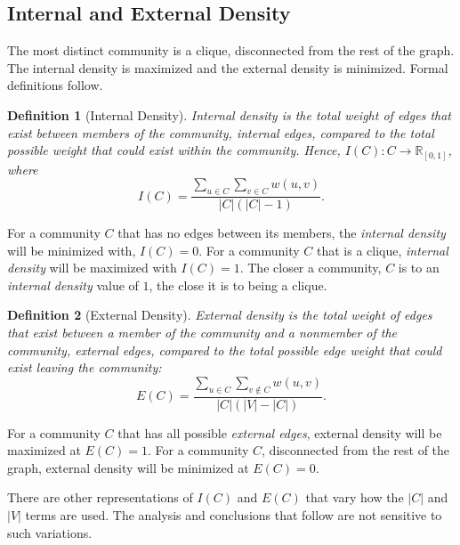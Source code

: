\documentclass[phd,tocprelim]{cornell}
\newtheorem{definition}{Definition}
\begin{document}
\subsection{Internal and External Density}

The most distinct community is a clique, disconnected from the rest of the graph.  The internal density is maximized and the external density is minimized.  Formal definitions follow.

\begin{definition}[Internal Density]
\label{def:int_density_single}
Internal density is the total weight of edges that exist between members of the community, {\it internal edges}, compared to the total possible weight that could exist within the community.  Hence, $I(C) : C \rightarrow \mathbb{R}_{[0, 1]}$, where
\begin{equation}
 I(C) =\frac{\sum_{u \in C} \sum_{v \in C} w(u,v)}{|C|(|C| - 1)} .
\end{equation}
\label{def_int_density}
\end{definition}

For a community $C$ that has no edges between its members, the {\it internal density} will be minimized with, $I(C) = 0$.  For a community $C$ that is a clique, {\it internal density} will be maximized with $I(C) = 1$.  The closer a community, $C$ is to an {\it internal density} value of $1$, the close it is to being a clique.  

\begin{definition}[External Density]
\label{def:ext_density_single}
External density is the total weight of edges that exist between a member of the community and a nonmember of the community, {\it external edges}, compared to the total possible edge weight that could exist leaving the community:
\begin{equation}
 E(C) = \frac{\sum_{u \in C} \sum_{v \notin C} w(u,v)}{|C|(|V| - |C|)}.
\end{equation}
\label{def_ext_density}
\end{definition}

For a community $C$ that has all possible {\it external edges}, external density will be maximized at $E(C)=1$.  For a community $C$, disconnected from the rest of the graph, external density will be minimized at $E(C) = 0$.

There are other representations of $I(C)$ and $E(C)$ that vary how the $|C|$ and $|V|$ terms are used.  The analysis and conclusions that follow are not sensitive to such variations.
\end{document}
